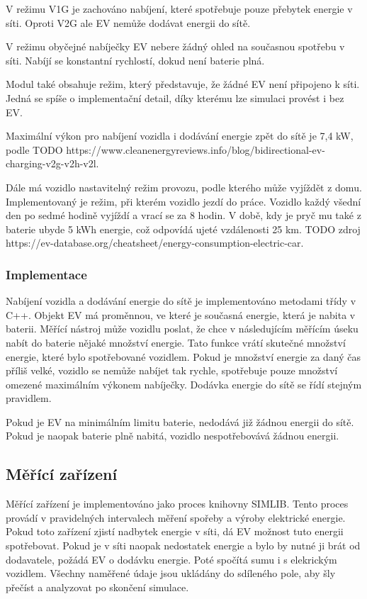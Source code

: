 \documentclass[12pt,a4paper]{article}
\begin{document}
V režimu V1G je zachováno nabíjení, které spotřebuje pouze přebytek energie v síti.
Oproti V2G ale EV nemůže dodávat energii do sítě.

V režimu obyčejné nabíječky EV nebere žádný ohled na současnou spotřebu v síti.
Nabíjí se konstantní rychlostí, dokud není baterie plná.

Modul také obsahuje režim, který představuje, že žádné EV není připojeno k síti.
Jedná se spíše o implementační detail, díky kterému lze simulaci provést i bez EV.

Maximální výkon pro nabíjení vozidla i dodávání energie zpět do sítě je 7,4 kW, podle TODO https://www.cleanenergyreviews.info/blog/bidirectional-ev-charging-v2g-v2h-v2l.

Dále má vozidlo nastavitelný režim provozu, podle kterého může vyjíždět z domu.
Implementovaný je režim, při kterém vozidlo jezdí do práce.
Vozidlo každý všední den po sedmé hodině vyjíždí a vrací se za 8 hodin.
V době, kdy je pryč mu také z baterie ubyde 5 kWh energie,
což odpovídá ujeté vzdálenosti 25 km. TODO zdroj https://ev-database.org/cheatsheet/energy-consumption-electric-car.

\subsubsection{Implementace}
Nabíjení vozidla a dodávání energie do sítě je implementováno metodami třídy v C++.
Objekt EV má proměnnou, ve které je současná energie, která je nabita v baterii.
Měřící nástroj může vozidlu poslat, že chce v následujícím měřícím úseku nabít do baterie nějaké množství energie.
Tato funkce vrátí skutečné množství energie, které bylo spotřebované vozidlem.
Pokud je množství energie za daný čas příliš velké,
vozidlo se nemůže nabíjet tak rychle, spotřebuje pouze množství omezené maximálním výkonem nabíječky.
Dodávka energie do sítě se řídí stejným pravidlem.

Pokud je EV na minimálním limitu baterie, nedodává již žádnou energii do sítě.
Pokud je naopak baterie plně nabitá, vozidlo nespotřebovává žádnou energii.



\subsection{Měřící zařízení}
Měřící zařízení je implementováno jako proces knihovny SIMLIB.
Tento proces provádí v pravidelných intervalech měření spořeby a výroby elektrické energie.
Pokud toto zařízení zjistí nadbytek energie v síti, dá EV možnost tuto energii spotřebovat.
Pokud je v síti naopak nedostatek energie a bylo by nutné ji brát od dodavatele, požádá EV o dodávku energie.
Poté spočítá sumu i s elekrickým vozidlem.
Všechny naměřené údaje jsou ukládány do sdíleného pole, aby šly přečíst a analyzovat po skončení simulace.
\end{document}
